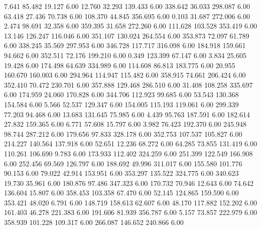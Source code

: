    7.641   85.482   19.127         6.00
  12.760   32.293  139.433         6.00
 338.642   36.033  298.087         6.00
  63.418   27.436   70.738         6.00
 108.370   44.845  356.695         6.00
   0.103   31.687  272.006         6.00
   2.474   98.691   32.358         6.00
 359.395   31.658  272.260         6.00
 111.628  103.528  353.419         6.00
  13.146  126.247  116.046         6.00
 351.107  130.024  264.554         6.00
 353.873   72.097   61.789         6.00
 338.245   35.569  297.953         6.00
 346.728  117.717  316.098         6.00
 184.918  159.661   94.662         6.00
 352.511   72.176  199.210         6.00
   0.349  123.399   67.147         6.00
   3.834   25.605   19.428         6.00
 174.498   64.639  334.989         6.00
 114.608   86.813  183.775         6.00
  20.955  160.670  160.003         6.00
 294.964  114.947  115.482         6.00
 358.915   74.661  206.424         6.00
 352.410   70.472  230.701         6.00
 357.888  129.468  286.510         6.00
  31.408  108.258  335.697         6.00
 174.959   24.060  170.828         6.00
 344.706  112.923   99.685         6.00
  53.543  130.368  154.584         6.00
   5.566   52.537  129.347         6.00
 154.005  115.193  119.061         6.00
 299.339   77.203   94.468         6.00
  13.683  131.645   75.985         6.00
   4.439   95.763  187.591         6.00
 182.614   27.832  159.365         6.00
   6.771   57.608   15.797         6.00
   3.982   76.423  192.370         6.00
 245.948   98.744  287.212         6.00
 179.656   97.833  328.178         6.00
 352.753  107.537  105.827         6.00
 214.227  140.564  137.918         6.00
  52.651   12.236   68.272         6.00
  64.285   73.855  131.419         6.00
 110.261  106.690    9.783         6.00
 173.933  112.402  324.259         6.00
 251.399  122.549  166.908         6.00
 252.456   69.569  126.797         6.00
 188.692   49.996  311.017         6.00
 155.580  101.776   90.153         6.00
  79.022   42.914  153.951         6.00
 353.297  135.522  324.775         6.00
 340.623   19.730   35.961         6.00
 180.876   97.486  347.323         6.00
 170.732   70.946   12.643         6.00
  74.642  136.604   15.807         6.00
 358.453  103.358   67.470         6.00
  52.145  124.865  159.590         6.00
 353.421   48.020    6.791         6.00
 148.719  158.613   62.607         6.00
  48.170  117.882  152.202         6.00
 161.403   46.278  221.383         6.00
 191.606   81.939  356.787         6.00
   5.157   73.857  222.979         6.00
 358.939  101.228  109.317         6.00
 266.087  146.652  240.866         6.00
